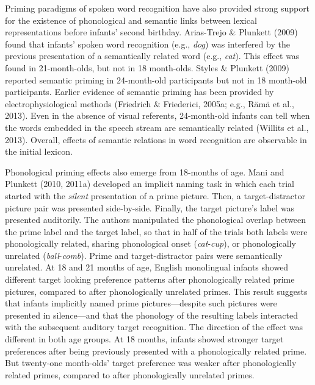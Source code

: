 \documentclass[
  12pt,
  b5paperpaper,
  twoside]{scrreprt}
\begin{document}
Priming paradigms of spoken word recognition have also provided strong
support for the existence of phonological and semantic links between
lexical representations before infants' second birthday. Arias-Trejo \&
Plunkett (2009) found that infants' spoken word recognition (e.g.,
\emph{dog}) was interfered by the previous presentation of a
semantically related word (e.g., \emph{cat}). This effect was found in
21-month-olds, but not in 18 month-olds. Styles \& Plunkett (2009)
reported semantic priming in 24-month-old participants but not in 18
month-old participants. Earlier evidence of semantic priming has been
provided by electrophysiological methods (Friedrich \& Friederici,
2005a; e.g., Rämä et al., 2013). Even in the absence of visual
referents, 24-month-old infants can tell when the words embedded in the
speech stream are semantically related (Willits et al., 2013). Overall,
effects of semantic relations in word recognition are observable in the
initial lexicon.

Phonological priming effects also emerge from 18-months of age. Mani and
Plunkett (2010, 2011a) developed an implicit naming task in which each
trial started with the \emph{silent} presentation of a prime picture.
Then, a target-distractor picture pair was presented side-by-side.
Finally, the target picture's label was presented auditorily. The
authors manipulated the phonological overlap between the prime label and
the target label, so that in half of the trials both labels were
phonologically related, sharing phonological onset
(\emph{cat}-\emph{cup}), or phonologically unrelated
(\emph{ball}-\emph{comb}). Prime and target-distractor pairs were
semantically unrelated. At 18 and 21 months of age, English monolingual
infants showed different target looking preference patterns after
phonologically related prime pictures, compared to after phonologically
unrelated primes. This result suggests that infants implicitly named
prime pictures---despite such pictures were presented in silence---and
that the phonology of the resulting labels interacted with the
subsequent auditory target recognition. The direction of the effect was
different in both age groups. At 18 months, infants showed stronger
target preferences after being previously presented with a
phonologically related prime. But twenty-one month-olds' target
preference was weaker after phonologically related primes, compared to
after phonologically unrelated primes.
\end{document}
